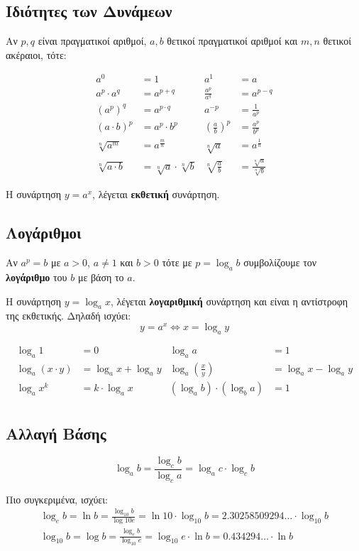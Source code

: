 

\subsection{Ιδιότητες των Δυνάμεων}

Αν $p,q$ είναι πραγματικοί αριθμοί, $a,b$ θετικοί πραγματικοί αριθμοί και $m,n$ θετικοί ακέραιοι, τότε:

\begin{align*}
  a^{0}&=1 & a^{1}&=a \\
  a^{p}\cdot a^{q}&=a^{p+q} & \frac{a^{p}}{a^{q}}&=a^{p-q}\\
  (a^{p})^{q}&=a^{p\cdot q} &  a^{-p}&=\frac{1}{a^{p}} \\
  (a\cdot b)^{p}&=a^{p}\cdot b^{p} & \left(\frac{a}{b}\right)^{p}&=\frac{a^{p}}{b^{p}} \\
  \sqrt[n]{a^{m}}&=a^{\frac{m}{n}} & \sqrt[n]{a}&=a^{\frac{1}{n}} \\
  \sqrt[n]{a\cdot b}&=\sqrt[n]{a}\cdot \sqrt[n]{b} & \sqrt[n]{\frac{a}{b}}&=\frac{\sqrt[n]{a}}{\sqrt[n]{b}}
\end{align*}

H συνάρτηση $y=a^{x}$, λέγεται \textbf{\color{blue} εκθετική} συνάρτηση.

\subsection{Λογάριθμοι}

Αν $a^{p}=b$ με $a>0$, $a\neq 1$ και $b>0$ τότε με $p=\log_{a}b$ συμβολίζουμε τον \textbf{λογάριθμο} του $b$ με βάση το $a$.

Η συνάρτηση $y=\log_{a}x$, λέγεται \textbf{\color{blue} λογαριθμική} συνάρτηση και είναι η αντίστροφη της εκθετικής. Δηλαδή ισχύει:
\[
y=a^{x}\Leftrightarrow x=\log_{a}y
\]

\begin{align*}
  \log_{a}1&=0 & \log_{a}a&=1 \\
  \log_{a}(x\cdot y)&=\log_{a}x+\log_{a}y & \log_{a}\left(\frac{x}{y}\right)&=\log_{a}x-\log_{a}y \\
  \log_{a}x^{k}&=k\cdot \log_{a}x & (\log_{a}b)\cdot (\log_{b}a)&=1 \\
\end{align*}

\subsection{Αλλαγή Βάσης}

\[
\log_{a}b=\frac{\log_{c}b}{\log_{c}a}=\log_{a}c\cdot \log_{c}b
\]

Πιο συγκεριμένα, ισχύει:
\begin{gather*}
  \log_{e}b=\ln b = \frac{\log_{10}b}{\log{10}e}=\ln 10\cdot \log_{10}b = {2.30258509294\ldots}\cdot \log_{10}b \\
  \log_{10}b=\log b = \frac{\log_{e}b}{\log_{10}e}=\log_{10}e\cdot \ln b = {0.434294\ldots}\cdot \ln b
\end{gather*}







